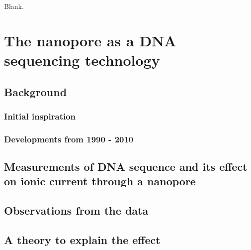 \begin{savequote}[75mm]
Blank.
\end{savequote}

\chapter{The nanopore as a DNA sequencing technology}
\label{dna_sequencing}

\section{Background}

\subsection{Initial inspiration}

\subsection{Developments from 1990 - 2010}

\section{Measurements of DNA sequence and its effect on ionic current through a nanopore}

\section{Observations from the data}

\section{A theory to explain the effect}